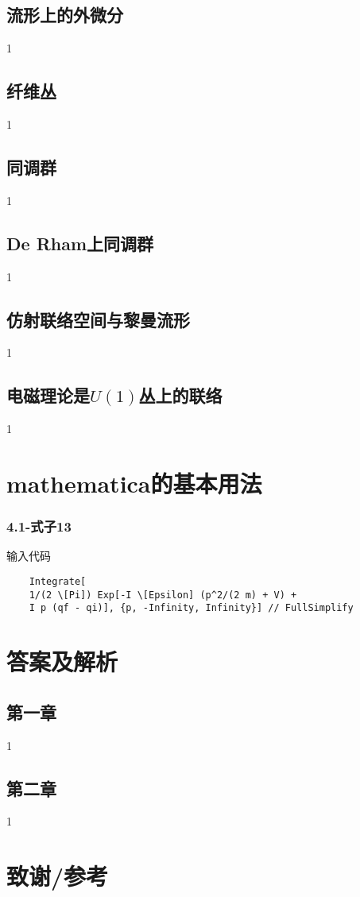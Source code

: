 \section{流形上的外微分}
1
\section{纤维丛}
1
\section{同调群}
1
\section{\textbf{De Rham}上同调群}
1
\section{仿射联络空间与黎曼流形}
1
\section{电磁理论是$U(1)$丛上的联络}
1





\chapter{mathematica的基本用法}
\subsection*{4.1-式子13}
输入代码
\begin{lstlisting}
    Integrate[
    1/(2 \[Pi]) Exp[-I \[Epsilon] (p^2/(2 m) + V) + 
    I p (qf - qi)], {p, -Infinity, Infinity}] // FullSimplify
\end{lstlisting}

\chapter{答案及解析}
\section{第一章}
1
\section{第二章}
1
\chapter{致谢/参考}
